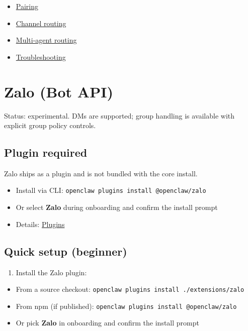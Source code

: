 \begin{itemize}
  \item \href{/channels/pairing}{Pairing}
  \item \href{/channels/channel-routing}{Channel routing}
  \item \href{/concepts/multi-agent}{Multi-agent routing}
  \item \href{/channels/troubleshooting}{Troubleshooting}
\end{itemize}



\clearpage

\section{Zalo (Bot API)}


Status: experimental. DMs are supported; group handling is available with explicit group policy controls.

\subsection{Plugin required}


Zalo ships as a plugin and is not bundled with the core install.

\begin{itemize}
  \item Install via CLI: \texttt{openclaw plugins install @openclaw/zalo}
  \item Or select \textbf{Zalo} during onboarding and confirm the install prompt
  \item Details: \href{/tools/plugin}{Plugins}
\end{itemize}


\subsection{Quick setup (beginner)}


\begin{enumerate}
  \item Install the Zalo plugin:
\end{enumerate}

\begin{itemize}
  \item From a source checkout: \texttt{openclaw plugins install ./extensions/zalo}
  \item From npm (if published): \texttt{openclaw plugins install @openclaw/zalo}
  \item Or pick \textbf{Zalo} in onboarding and confirm the install prompt
\end{itemize}

